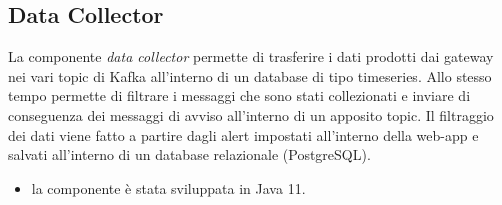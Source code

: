 \subsection{Data Collector}
La componente \textit{data collector} permette di trasferire i dati prodotti dai gateway nei vari topic di Kafka all'interno di un database di tipo timeseries. Allo stesso tempo permette di filtrare i messaggi che sono stati collezionati e inviare di conseguenza dei messaggi di avviso all'interno di un apposito topic.
Il filtraggio dei dati viene fatto a partire dagli alert impostati all'interno della web-app e salvati all'interno di un database relazionale (PostgreSQL).
\begin{itemize}
	\item la componente è stata sviluppata in Java 11.
\end{itemize}

